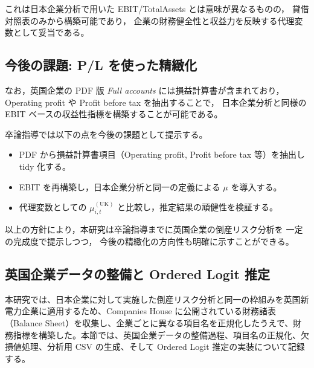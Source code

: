 これは日本企業分析で用いた EBIT/TotalAssets とは意味が異なるものの，
貸借対照表のみから構築可能であり，
企業の財務健全性と収益力を反映する代理変数として妥当である。

\subsection*{今後の課題: P/L を使った精緻化}

なお，英国企業の PDF 版 \textit{Full accounts} には損益計算書が含まれており，
Operating profit や Profit before tax を抽出することで，
日本企業分析と同様の EBIT ベースの収益性指標を構築することが可能である。

卒論指導では以下の点を今後の課題として提示する。

\begin{itemize}
  \item PDF から損益計算書項目（Operating profit, Profit before tax 等）を抽出し tidy 化する。
  \item EBIT を再構築し，日本企業分析と同一の定義による $\mu$ を導入する。
  \item 代理変数としての $\mu_{i,t}^{(\text{UK})}$ と比較し，推定結果の頑健性を検証する。
\end{itemize}

以上の方針により，本研究は卒論指導までに英国企業の倒産リスク分析を
一定の完成度で提示しつつ，
今後の精緻化の方向性も明確に示すことができる。

\subsection*{英国企業データの整備と Ordered Logit 推定}

本研究では、日本企業に対して実施した倒産リスク分析と同一の枠組みを英国新電力企業に適用するため、Companies House に公開されている財務諸表（Balance Sheet）を収集し、企業ごとに異なる項目名を正規化したうえで、財務指標を構築した。本節では、英国企業データの整備過程、項目名の正規化、欠損値処理、分析用 CSV の生成、そして Ordered Logit 推定の実装について記録する。

